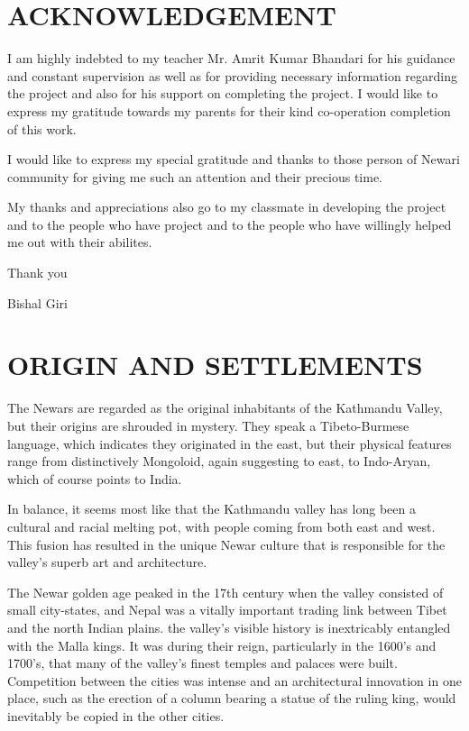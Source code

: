 \documentclass[a4paper,13pt, margin=0.9in]{article}
\begin{document}
\begin{flushleft}
	\section*{ACKNOWLEDGEMENT}
	I am highly indebted to my teacher Mr. Amrit Kumar Bhandari for his guidance and constant supervision as well as for providing necessary information regarding the project and also for his support on completing the project. I would like to express my gratitude towards my parents for their kind co-operation completion of this work.
	\vskip0.5cm


	I would like to express my special gratitude and thanks to those person of Newari community for giving me such an attention and their precious time.
	\vskip0.5cm

	My thanks and appreciations also go to my classmate in developing the project and to the people who have project  and to the people who have willingly helped me out with their abilites.
	\vskip0.5cm

	Thank you





	\begin{flushright}
		Bishal Giri
	\end{flushright}


	\newpage
	\tableofcontents

	\newpage

	\section{ORIGIN AND SETTLEMENTS}

	The Newars are regarded as the original inhabitants of the Kathmandu Valley, but their origins are shrouded in mystery. They speak a Tibeto-Burmese language, which indicates they originated in the east, but their physical features range from distinctively Mongoloid, again suggesting to east, to Indo-Aryan, which of course points to India.
	\vskip0.5cm

	In balance, it seems most like that the Kathmandu valley has long been a cultural and racial melting pot, with people coming from both east and west. This fusion has resulted in the unique Newar culture that is responsible for the valley's superb art and architecture.
	\vskip0.5cm

	The Newar golden age peaked in the 17th century when the valley consisted of small city-states, and Nepal was a vitally important trading link between Tibet and the north Indian plains. the valley's visible history is inextricably entangled with the Malla kings. It was during their reign, particularly in the 1600's and 1700's, that many of the valley's finest temples and palaces were built. Competition between the cities was intense and an architectural innovation in one place, such as the erection of a column bearing a statue of the ruling king, would inevitably be copied in the other cities.
	\vskip0.5cm


\end{flushleft}
\end{document}
